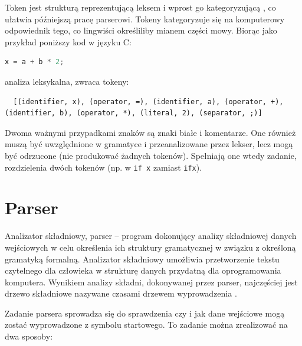 \documentclass[a4paper,12pt]{book} %
\begin{document}
Token jest strukturą reprezentującą leksem i wprost go kategoryzującą \cite{ Aho__Sethi__Ullman__1985}, co ułatwia późniejszą pracę parserowi. Tokeny kategoryzuje się na komputerowy odpowiednik tego, co lingwiści określiliby mianem części mowy. Biorąc jako przykład poniższy kod w języku C:
\begin{lstlisting}[language=c]
  x = a + b * 2;
\end{lstlisting}
analiza leksykalna, zwraca tokeny:
\begin{lstlisting}
  [(identifier, x), (operator, =), (identifier, a), (operator, +), (identifier, b), (operator, *), (literal, 2), (separator, ;)]
\end{lstlisting}
Dwoma ważnymi przypadkami znaków są znaki białe i komentarze. One również muszą być uwzględnione w gramatyce i przeanalizowane przez lekser, lecz mogą być odrzucone (nie produkować żadnych tokenów). Spełniają one wtedy zadanie, rozdzielenia dwóch tokenów (np. w \lstinline{if x} zamiast \lstinline{ifx}).

\section{Parser}
Analizator składniowy, parser – program dokonujący analizy składniowej danych wejściowych w celu określenia ich struktury gramatycznej w związku z określoną gramatyką formalną. Analizator składniowy umożliwia przetworzenie tekstu czytelnego dla człowieka w strukturę danych przydatną dla oprogramowania komputera. Wynikiem analizy składni, dokonywanej przez parser, najczęściej jest drzewo składniowe nazywane czasami drzewem wyprowadzenia \cite{Aho__Sethi__Ullman__1985}.



Zadanie parsera sprowadza się do sprawdzenia czy i jak dane wejściowe mogą zostać wyprowadzone z symbolu startowego. To zadanie można zrealizować na dwa sposoby:
\end{document}
